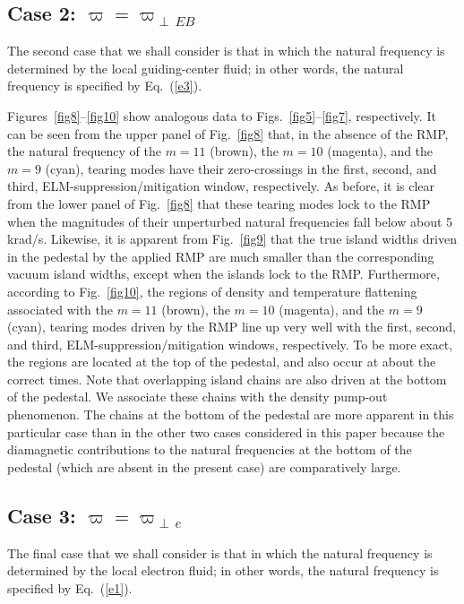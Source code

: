 \documentclass[12pt,prb,aps]{revtex4-1}
\begin{document}
\subsection{Case 2: $\varpi=\varpi_{\perp\,EB}$}
The second case that we shall consider is that in which the natural frequency is determined by the local guiding-center fluid; 
in other words, the natural frequency is specified by Eq.~(\ref{e3}). 

Figures~\ref{fig8}--\ref{fig10} show analogous data to Figs.~\ref{fig5}--\ref{fig7}, respectively. It can be seen from the
upper panel of Fig.~\ref{fig8} that, in the absence of the RMP,  the natural frequency of the $m=11$ (brown), the $m=10$ (magenta), and the $m=9$ (cyan), tearing modes have their
zero-crossings in the  first, second, and third, ELM-suppression/mitigation window, respectively. As before, it is clear from the lower panel of Fig.~\ref{fig8} that these tearing modes lock
to the RMP when the magnitudes of their unperturbed natural frequencies fall below about 5 krad/s. 
Likewise, it is apparent from Fig.~\ref{fig9} that the true island widths driven in the pedestal by the applied
RMP are much smaller than the corresponding vacuum island widths, except when the islands lock to the RMP.
Furthermore, according to Fig.~\ref{fig10}, the regions of density and temperature flattening associated
with the $m=11$ (brown), the $m=10$ (magenta), and the $m=9$ (cyan), tearing modes driven by the RMP line up
very well with the first, second, and third, ELM-suppression/mitigation windows, respectively. To be more exact, the regions are located at
the top of the pedestal, and also occur at about the correct times. Note that overlapping island chains
are also driven at the bottom of the pedestal. We associate these chains with the density pump-out phenomenon.\cite{hu,rf2} The chains at the bottom of the pedestal are more apparent
in this particular case than in the other two cases considered in this paper because the diamagnetic contributions to the natural frequencies at the bottom of the pedestal (which are absent
in the present case) are comparatively large. 

\subsection{Case 3: $\varpi=\varpi_{\perp\,e}$}
The final case that we shall consider is that in which the natural frequency is determined by the local electron fluid; 
in other words, the natural frequency is specified by Eq.~(\ref{e1}). 
\end{document}
